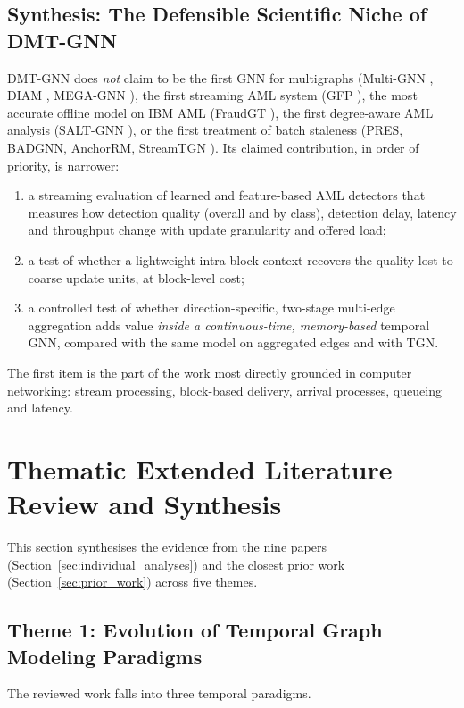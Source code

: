\documentclass[11pt,a4paper]{article}
\begin{document}
\subsection{Synthesis: The Defensible Scientific Niche of DMT-GNN}
DMT-GNN does \emph{not} claim to be the first GNN for multigraphs (Multi-GNN \cite{egressy2024multigraph}, DIAM \cite{ding2024diam}, MEGA-GNN \cite{bilgi2026mega}), the first streaming AML system (GFP \cite{blanusa2024gfp}), the most accurate offline model on IBM AML (FraudGT \cite{lin2024fraudgt}), the first degree-aware AML analysis (SALT-GNN \cite{losavio2026saltgnn}), or the first treatment of batch staleness (PRES, BADGNN, AnchorRM, StreamTGN \cite{su2024pres,zhou2025badgnn,anchorrm2026,streamtgn2026}). Its claimed contribution, in order of priority, is narrower:
\begin{enumerate}[leftmargin=*]
    \item a streaming evaluation of learned and feature-based AML detectors that measures how detection quality (overall and by class), detection delay, latency and throughput change with update granularity and offered load;
    \item a test of whether a lightweight intra-block context recovers the quality lost to coarse update units, at block-level cost;
    \item a controlled test of whether direction-specific, two-stage multi-edge aggregation adds value \emph{inside a continuous-time, memory-based} temporal GNN, compared with the same model on aggregated edges and with TGN.
\end{enumerate}
The first item is the part of the work most directly grounded in computer networking: stream processing, block-based delivery, arrival processes, queueing and latency.

\section{Thematic Extended Literature Review and Synthesis}
\label{sec:thematic_review}

This section synthesises the evidence from the nine papers (Section~\ref{sec:individual_analyses}) and the closest prior work (Section~\ref{sec:prior_work}) across five themes.

\subsection{Theme 1: Evolution of Temporal Graph Modeling Paradigms}
The reviewed work falls into three temporal paradigms.
\end{document}
